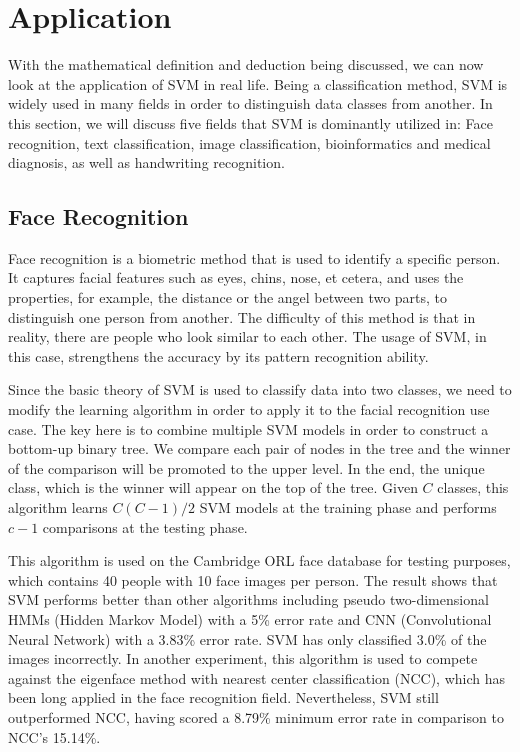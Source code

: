 \section{Application}
With the mathematical definition and deduction being discussed, we can now
look at the application of SVM in real life. Being a classification method,
SVM is widely used in many fields in order to distinguish data classes from
another. In this section, we will discuss five fields that SVM is dominantly
utilized in: Face recognition, text classification, image classification,
bioinformatics and medical diagnosis, as well as handwriting recognition.

\subsection*{Face Recognition}
Face recognition is a biometric method that is used to identify a specific
person. It captures facial features such as eyes, chins, nose, et cetera, and
uses the properties, for example, the distance or the angel between two parts, 
to distinguish one person from another. The difficulty of this method is that
in reality, there are people who look similar to each other. The usage of SVM, 
in this case, strengthens the accuracy by its pattern recognition ability.

Since the basic theory of SVM is used to classify data into two classes, we
need to modify the learning algorithm in order to apply it to the facial
recognition use case. The key here is to combine multiple SVM models in order
to construct a bottom-up binary tree. We compare each pair of nodes in the
tree and the winner of the comparison will be promoted to the upper level.
In the end, the unique class, which is the winner will appear on the top of 
the tree. Given $C$ classes, this algorithm learns $C(C-1)/2$ SVM models at
the training phase and performs $c-1$ comparisons at the testing phase.

This algorithm is used on the Cambridge ORL face database for testing purposes, 
which contains 40 people with 10 face images per person.
The result shows that SVM performs better than other algorithms including
pseudo two-dimensional HMMs (Hidden Markov Model) with a 5\% error rate 
and CNN (Convolutional Neural Network) with a 3.83\% error rate. SVM has
only classified 3.0\% of the images incorrectly. In another experiment,
this algorithm is used to compete against the eigenface method
with nearest center classification (NCC), which has been long applied
in the face recognition field. Nevertheless, SVM still outperformed NCC,
having scored a 8.79\% minimum error rate in comparison to NCC's 15.14\%.
\cite{face-recognition}

